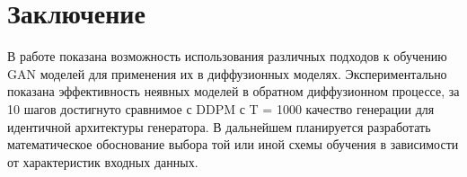 \documentclass{article}
\begin{document}
\section{Заключение}
В работе показана возможность использования различных подходов к обучению GAN моделей для применения их в диффузионных моделях. Экспериментально показана эффективность неявных моделей в обратном диффузионном процессе, за 10 шагов достигнуто сравнимое с DDPM с T = 1000 качество генерации для идентичной архитектуры генератора. В дальнейшем планируется разработать математическое обоснование выбора той или иной схемы обучения в зависимости от характеристик входных данных.



\end{document}
